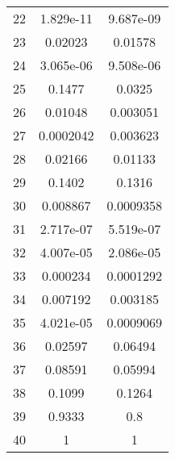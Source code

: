 \begin{table}[h!]
\begin{tabular}{||c|c|c||}
    22           & 1.829e-11           & 9.687e-09           \\
    23           & 0.02023             & 0.01578             \\
    24           & 3.065e-06           & 9.508e-06           \\
    25           & 0.1477              & 0.0325              \\
    26           & 0.01048             & 0.003051            \\
    27           & 0.0002042           & 0.003623            \\
    28           & 0.02166             & 0.01133             \\
    29           & 0.1402              & 0.1316              \\
    30           & 0.008867            & 0.0009358           \\
    31           & 2.717e-07           & 5.519e-07           \\
    32           & 4.007e-05           & 2.086e-05           \\
    33           & 0.000234            & 0.0001292           \\
    34           & 0.007192            & 0.003185            \\
    35           & 4.021e-05           & 0.0009069           \\
    36           & 0.02597             & 0.06494             \\
    37           & 0.08591             & 0.05994             \\
    38           & 0.1099              & 0.1264              \\
    39           & 0.9333              & 0.8                 \\
    40           & 1                   & 1                   \\
    \bottomrule
  \end{tabular}
  \label{tab:stat_tests}
\end{table}


